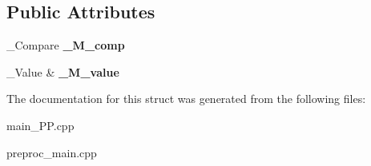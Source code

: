 \subsection*{Public Attributes}
\begin{DoxyCompactItemize}
\item 
\hypertarget{struct____gnu__cxx_1_1____ops_1_1__Iter__comp__to__val_ab817f60f0ebe4eb0448830b831106445}{\+\_\+\+Compare {\bfseries \+\_\+\+M\+\_\+comp}}\label{struct____gnu__cxx_1_1____ops_1_1__Iter__comp__to__val_ab817f60f0ebe4eb0448830b831106445}

\item 
\hypertarget{struct____gnu__cxx_1_1____ops_1_1__Iter__comp__to__val_ac997df6c7e15742a9664123d940fa2d6}{\+\_\+\+Value \& {\bfseries \+\_\+\+M\+\_\+value}}\label{struct____gnu__cxx_1_1____ops_1_1__Iter__comp__to__val_ac997df6c7e15742a9664123d940fa2d6}

\end{DoxyCompactItemize}


The documentation for this struct was generated from the following files\+:\begin{DoxyCompactItemize}
\item 
main\+\_\+\+P\+P.\+cpp\item 
preproc\+\_\+main.\+cpp\end{DoxyCompactItemize}
